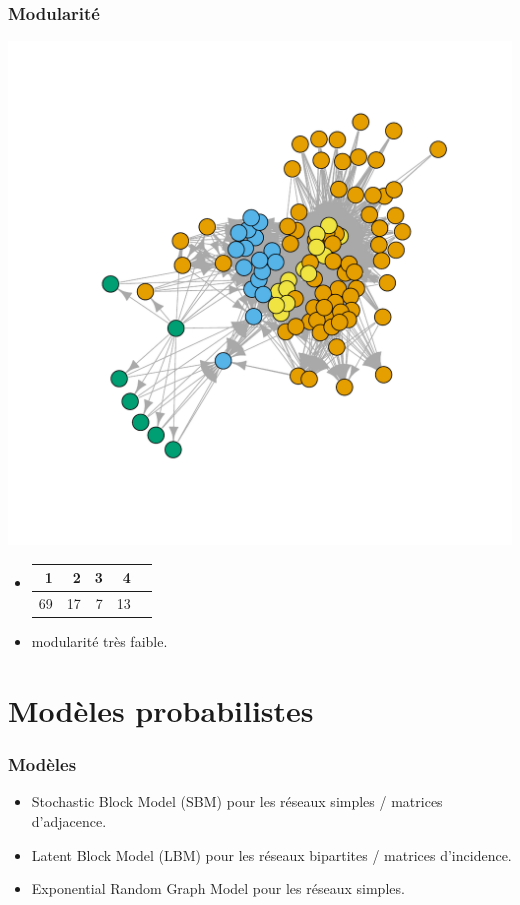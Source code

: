 \documentclass[nopagenumber,9pt]{beamer}
\begin{document}
\begin{frame}
 \frametitle{Modularité}
\begin{center}
  \includegraphics[scale=.3]{plots/chilean_modularity.pdf}
 \end{center}
 
 
 
 \begin{itemize}
  \item
  \begin{tabular}{rrrrr}
  \hline
 1 & 2 & 3 & 4 \\ 
  \hline
  69 &  17 &   7 &  13 \\ 
   \hline
\end{tabular}
\item modularité très faible.
 \end{itemize}

 
\end{frame}


\section{Modèles probabilistes}


\begin{frame}
 \frametitle{Modèles}
 
 
 \begin{itemize}
  \item Stochastic Block Model (SBM) pour les réseaux simples / matrices d'adjacence.
  \item Latent Block Model (LBM) pour les réseaux bipartites / matrices d'incidence.
  \item Exponential Random Graph Model pour les réseaux simples.
 \end{itemize}

\end{frame}
\end{document}
